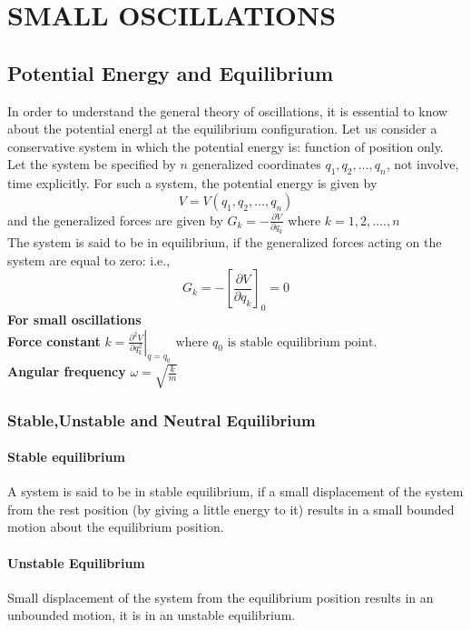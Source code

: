 \chapter{SMALL OSCILLATIONS}
\section{Potential Energy and Equilibrium}
In order to understand the general theory of oscillations, it is essential to know about the potential energl at the equilibrium configuration. Let us consider a conservative system in which the potential energy is: function of position only. Let the system be specified by $n$ generalized coordinates $q_{1}, q_{2}, \ldots, q_{n}$, not involve, time explicitly. For such a system, the potential energy is given by
$$
V=V\left(q_{1}, q_{2}, \ldots, q_{n}\right)
$$
and the generalized forces are given by
$G_{k}=-\frac{\partial V}{\partial q_{k}}$ where $k=1,2, \ldots ., n$\\
The system is said to be in equilibrium, if the generalized forces acting on the system are equal to zero: i.e.,
$$
G_{k}=-\left[\frac{\partial V}{\partial q_{k}}\right]_{0}=0
$$
\textbf{For small oscillations}\\
\textbf{Force constant} $k=\left.\frac{\partial^{2} V}{\partial q_k^{2}}\right|_{q=q_{0}} \text { where } q_{0} \text { is stable equilibrium point. }$\\
\textbf{Angular frequency} $\omega=\sqrt{\frac{k}{m}}$
\subsection{Stable,Unstable and Neutral Equilibrium}
\subsubsection{Stable equilibrium}
A system is said to be in stable equilibrium, if a small displacement of the system from the rest position (by giving a little energy to it) results in a small bounded motion about the equilibrium position.
\subsubsection{Unstable Equilibrium}
Small displacement of the system from the equilibrium position results in an unbounded motion, it is in an unstable equilibrium.
